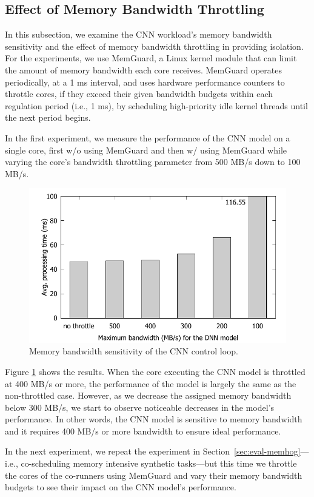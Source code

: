 \subsection{Effect of Memory Bandwidth Throttling}

In this subsection, we examine the CNN workload's memory bandwidth
sensitivity and the effect of memory bandwidth throttling in providing
isolation. For the experiments, we use MemGuard\cite{Yun2013}, a Linux
kernel module that can limit the amount of memory bandwidth each core
receives. MemGuard
operates periodically, at a 1 ms interval, and uses hardware
performance counters to throttle cores, if they exceed their given
bandwidth budgets within each regulation period (i.e., 1 ms), by
scheduling high-priority idle kernel threads until the next period begins.


In the first experiment, we measure the performance of the CNN model
on a single core, first w/o using MemGuard and then w/
using MemGuard while varying the core's bandwidth throttling parameter
from 500 MB/s down to 100 MB/s.

\begin{figure}[h]
  \centering
  \includegraphics[width=.45\textwidth]{figs/memguard_multicore}
  \caption{Memory bandwidth sensitivity of the CNN control loop.}
  \label{fig:memguard_multicore}
\end{figure}

Figure \ref{fig:memguard_multicore} shows the results. When the core
executing the CNN model is throttled at 400 MB/s or more, the performance
of the model is largely the same as the non-throttled case. However, as
we decrease the assigned memory bandwidth below 300 MB/s, we start to
observe noticeable decreases in the model's performance. In other
words, the CNN model is sensitive to memory bandwidth and it
requires 400 MB/s or more bandwidth to ensure ideal performance.

In the next experiment, we repeat the experiment in
Section~\ref{sec:eval-memhog}---i.e., co-scheduling memory intensive
synthetic tasks---but this time we
throttle the cores of the co-runners using MemGuard and vary their
memory bandwidth budgets to see their impact on the CNN model's 
performance.

